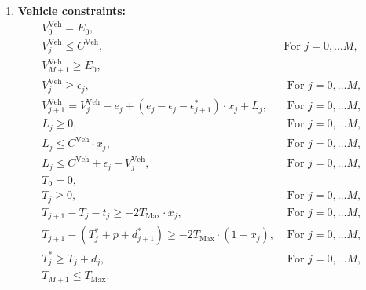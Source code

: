 \documentclass[11pt]{article}
\theoremstyle{plain}%
\theoremstyle{definition} \newtheorem{lem}{Lemma}[section]
\theoremstyle{definition} \newtheorem{claim}{Claim}[lem]
\theoremstyle{definition} \newtheorem{theorem}{Theorem}[section]
\theoremstyle{definition} \newtheorem{exo}{Exercice n$^\circ$}
\theoremstyle{definition} \newtheorem{quest}{}[exo]
\theoremstyle{definition} \newtheorem{sousquest}{}[quest]
\theoremstyle{remark}
\theoremstyle{definition}
\begin{document}
\begin{enumerate}
\item {\bf Vehicle constraints:}
\begin{eqnarray}	
V_{0}^{\textrm{Veh}}= E_0,  && \label{Prod11} \\
V_{j}^{\textrm{Veh}}\leq C^{\textrm{Veh}},&\textrm {For   } j = 0, \ldots M ,&\label{Prod13}\\
V_{M+1}^{\textrm{Veh}}\geq E_{0},&& \label{Prod12}\\
V_{j}^{\textrm{Veh}} \geq \epsilon_{j},& \textrm{ For }  j = 0, \ldots M,&\label{Prod14}\\
V_{j+1}^{\textrm{Veh}}=V_{j}^{\textrm{Veh}}-e_j + (e_j-\epsilon_j-\epsilon^*_{j+1}) \cdot x_j +L_j,& \textrm{ For  } j = 0, \ldots M ,&\label{Prod15}\\
L_j \geq 0,& \textrm{ For }  j = 0, \ldots M ,&\label{Prod16}\\
 L_j \leq C^{\textrm{Veh}} \cdot  x_j ,& \textrm{ For }  j = 0, \ldots M ,&\label{Prod17}\\
L_j \leq C^{\textrm{Veh}} + \epsilon_{j}-V_{j}^{\textrm{Veh}},& \textrm{ For }  j = 0, \ldots M ,&\label{Prod18}\\
T_{0}= 0,&& \label{Prod19}\\
T_{j}  \geq 0,&\textrm{ For }  j = 0, \ldots M ,& \label{Prod19bis}\\
T_{j+1}-T_j-t_j\geq -2T_{\textrm{Max}} \cdot x_j ,& \textrm{ For }  j = 0, \ldots M ,&\label{Prod20}\\
 T_{j+1} -(T^*_j+p+d^*_{j+1}) \geq -2T_{\textrm{Max}} \cdot (1-x_j ),& \textrm{ For    } j = 0, \ldots M ,&\label{Prod21}\\
T_{j}^*\geq T_j + d_j,& \textrm{ For }  j = 0, \ldots M,&\label{Prod21bis} \\
T_{M+1}\leq T_{\textrm{Max}}.&& \label{Prod22}
\end{eqnarray}


\end{enumerate}
\end{document}
